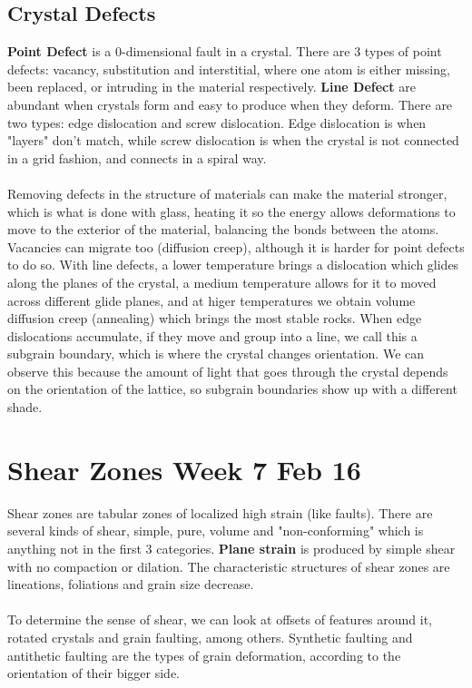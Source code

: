 \documentclass[12pt,a4paper]{report}
\begin{document}
\subsection*{Crystal Defects}
\textbf{Point Defect} is a 0-dimensional fault in a crystal.
There are 3 types of point defects: vacancy, substitution and interstitial, where one atom is either missing, been replaced, or intruding in the material respectively.
\textbf{Line Defect} are abundant when crystals form and easy to produce when they deform.
There are two types: edge dislocation and screw dislocation.
Edge dislocation is when "layers" don't match, while screw dislocation is when the crystal is not connected in a grid fashion, and connects in a spiral way.\\
\\
Removing defects in the structure of materials can make the material stronger, which is what is done with glass, heating it so the energy allows deformations to move to the exterior of the material, balancing the bonds between the atoms.
Vacancies can migrate too (diffusion creep), although it is harder for point defects to do so.
With line defects, a lower temperature brings a dislocation which glides along the planes of the crystal, a medium temperature allows for it to moved across different glide planes, and at higer temperatures we obtain volume diffusion creep (annealing) which brings the most stable rocks.
When edge dislocations accumulate, if they move and group into a line, we call this a subgrain boundary, which is where the crystal changes orientation. We can observe this because the amount of light that goes through the crystal depends on the orientation of the lattice, so subgrain boundaries show up with a different shade.

\section*{Shear Zones Week 7 Feb 16}
Shear zones are tabular zones of localized high strain (like faults).
There are several kinds of shear, simple, pure, volume and "non-conforming" which is anything not in the first 3 categories.
\textbf{Plane strain} is produced by simple shear with no compaction or dilation.
The characteristic structures of shear zones are lineations, foliations and grain size decrease.\\
\\
To determine the sense of shear, we can look at offsets of features around it, rotated crystals and grain faulting, among others.
Synthetic faulting and antithetic faulting are the types of grain deformation, according to the orientation of their bigger side.
\end{document}
